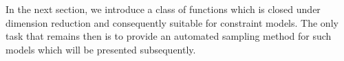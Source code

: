 \documentclass[letterpaper]{article}
\begin{document}
In the next section, we introduce a class of functions which is closed under dimension reduction and consequently suitable for constraint models. 
The only task that remains then
is to provide an automated sampling method for such models which will be presented subsequently. %
\end{document}
